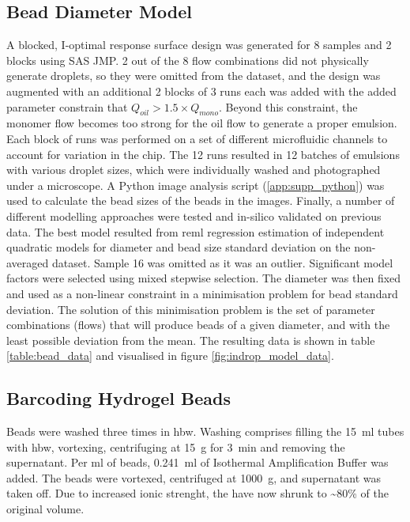 \begin{appendix}
\begin{multicols}{2}
\subsection{Bead Diameter Model}
\label{app:meth_model}
A blocked, I-optimal response surface design was generated for 8 samples and 2 blocks using SAS JMP. 2 out of the 8 flow combinations did not physically generate droplets, so they were omitted from the dataset, and the design was augmented with an additional 2 blocks of 3 runs each was added with the added parameter constrain that $Q_{oil} > 1.5 \times Q_{mono}$. Beyond this constraint, the monomer flow becomes too strong for the oil flow to generate a proper emulsion. Each block of runs was performed on a set of different microfluidic channels to account for variation in the chip. The 12 runs resulted in 12 batches of emulsions with various droplet sizes, which were individually washed and photographed under a microscope. A Python image analysis script (\ref{app:supp_python}) was used to calculate the bead sizes of the beads in the images. Finally, a number of different modelling approaches were tested and in-silico validated on previous data. The best model resulted from \acrshort{reml} regression estimation of independent quadratic models for diameter and bead size standard deviation on the non-averaged dataset. Sample 16 was omitted as it was an outlier. Significant model factors were selected using mixed stepwise selection. The diameter was then fixed and used as a non-linear constraint in a minimisation problem for bead standard deviation. The solution of this minimisation problem is the set of parameter combinations (flows) that will produce beads of a given diameter, and with the least possible deviation from the mean. The resulting data is shown in table \ref{table:bead_data} and visualised in figure \ref{fig:indrop_model_data}.

\subsection{Barcoding Hydrogel Beads}
\label{app:meth_splitpool}
Beads were washed three times in \acrshort{hbw}. Washing comprises filling the \SI{15}{\ml} tubes with \acrshort{hbw}, vortexing, centrifuging at \SI{15}{\g} for \SI{3}{\minute} and removing the supernatant. Per \si{\ml} of beads, \SI{0.241}{\ml} of Isothermal Amplification Buffer was added. The beads were vortexed, centrifuged at \SI{1000}{\g}, and supernatant was taken off. Due to increased ionic strenght, the  have now shrunk to \textasciitilde{}80\% of the original volume.\pms


\end{multicols}
\end{appendix}
